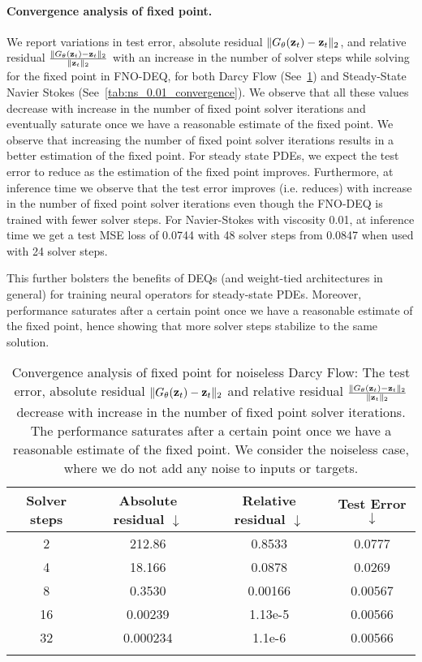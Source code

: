 \paragraph{Convergence analysis of fixed point.} We report variations in test error, absolute residual $\| G_\theta({\mathbf{z}}_t) - {\mathbf{z}}_t\|_2$, and relative residual $\frac{\| G_\theta({\mathbf{z}}_t) - {\mathbf{z}}_t\|_2}{\| {\mathbf{z}}_t \|_2}$ with an increase in the number of solver steps while solving for the fixed point in FNO-DEQ, for both Darcy Flow (See~\cref{tab:darcy_flow_convergence}) and Steady-State Navier Stokes (See~\cref{tab:ns_0.01_convergence}). We observe that all these values decrease with increase in the number of fixed point solver iterations and eventually saturate once we have a reasonable estimate of the fixed point. 
We observe that increasing the number of fixed point solver iterations results in a better estimation of the fixed point. 
For steady state PDEs, we expect the test error to reduce as the estimation of the fixed point improves. 
Furthermore, at inference time we observe that the test error improves (i.e. reduces) with increase in the number of fixed point solver iterations even though the FNO-DEQ is trained with fewer solver steps.
For Navier-Stokes with viscosity 0.01, at inference time we get a test MSE loss of 0.0744 with 48 solver steps from 0.0847 when used with 24 solver steps.

This further bolsters the benefits of DEQs (and weight-tied architectures in general) for training neural operators for steady-state PDEs. Moreover, performance saturates after a certain point once we have a reasonable estimate of the fixed point, hence showing that more solver steps stabilize to the same solution.



\begin{table}[th!]
    \centering
    \begin{tabular}{cccc}
    \toprule
    Solver steps & Absolute residual $\downarrow$  & Relative residual $\downarrow$  & Test Error $\downarrow$ \\
    \midrule
    2 & 212.86 & 0.8533 & 0.0777 \\
    4 & 18.166 & 0.0878 & 0.0269 \\
    8 & 0.3530 & 0.00166 & 0.00567 \\
    16 & 0.00239 & 1.13e-5 & 0.00566 \\
    32 & 0.000234 & 1.1e-6 & 0.00566 \\
    \bottomrule \\
    \end{tabular}
    \caption{Convergence analysis of fixed point for noiseless Darcy Flow: The test error, absolute residual $\| G_\theta({\mathbf{z}}_t) - {\mathbf{z}}_t\|_2$ and relative residual $\frac{\| G_\theta({\mathbf{z}}_t) - {\mathbf{z}}_t\|_2}{\| {\mathbf{z}}_t \|_2}$ decrease with increase in the number of fixed point solver iterations. The performance saturates after a certain point once we have a reasonable estimate of the fixed point. We consider the noiseless case, where we do not add any noise to inputs or targets. }
    \label{tab:darcy_flow_convergence}
\end{table}

